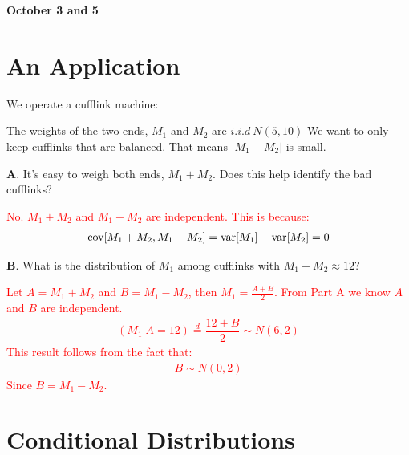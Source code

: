 \documentclass[../../../Master/AppliedStochastics.tex]{subfiles}
\author{Chandler}  %
\date{October 3 and 5}    %
\begin{document}
%


\makelecture %
\textbf{October 3 and 5}
\section{An Application}

We operate a cufflink machine:

\begin{center}
\end{center}

The weights of the two ends, $M_1$ and $M_2$ are $i.i.d\ N(5,10)$ 
We want to only keep cufflinks that are balanced. 
That means $\lvert M_{1} - M_{2} \rvert$ is small.

\textbf{A}. It's easy to weigh both ends, $M_{1}+M_{2}$. 
Does this help identify the bad cufflinks?

\textcolor{Red}{No. $M_{1}+M_{2}$ and $M_{1}-M_{2}$ are independent. 
	This is because: 
	$$\begin{aligned}
	\operatorname{cov} [M_{1}+M_{2}, M_{1}-M_{2}] = \operatorname{var} [M_{1}]-\operatorname{var} [M_{2}] = 0
	\end{aligned}$$ }

\textbf{B}. What is the distribution of $M_{1}$ among cufflinks with 
$M_{1}+M_{2}\approx 12$? 

\textcolor{Red}{Let $A=M_{1}+M_{2}$ and $B=M_{1}-M_{2}$, then 
$M_{1}=\frac{A+B}{2}$. 
	From Part A we know $A$ and $B$ are independent. 
	$$\begin{aligned}
	(M_{1}\vert A=12) \stackrel{d}{=} \dfrac{12 + B}{2} \sim N(6,2)
	\end{aligned}$$
	This result follows from the fact that: 
	$$\begin{aligned}
	B \sim N(0,2)
	\end{aligned}$$ 
	Since $B=M_{1}-M_{2}$.
}


\section{Conditional Distributions}
\end{document}
